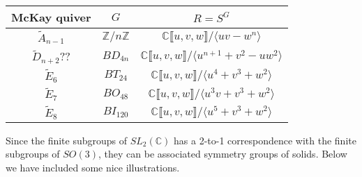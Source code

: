 \documentclass[11pt, a4paper, english]{article}
\theoremstyle{definition}
\newcommand{\C}{\mathbb{C}}
\begin{document}
\begin{center}
{\renewcommand{\arraystretch}{1.6}
\begin{tabular}{|c|c|c|}
\hline
McKay quiver & $G$ & $R = S^G$\\
\hline\hline
$\tilde{A}_{n-1}$ & $\mathbb{Z}/n\mathbb{Z}$ &
$\C \llbracket u, v, w \rrbracket/\langle uv - w^n \rangle$
\\
\hline
$\tilde{D}_{n+2}$?? & $BD_{4n}$ &
$\C \llbracket u, v, w \rrbracket/\langle u^{n+1} + v^2 - uw^2\rangle$
\\
\hline
$\tilde{E}_6$ & $BT_{24}$ &
$\C \llbracket u, v, w \rrbracket/\langle u^4 + v^3 + w^2 \rangle$
\\
\hline
$\tilde{E}_7$ & $BO_{48}$ &
$\C \llbracket u, v, w \rrbracket/\langle u^3v + v^3 + w^2 \rangle$
\\
\hline
$\tilde{E}_8$ & $BI_{120}$ &
$\C \llbracket u, v, w \rrbracket/\langle u^5 + v^3 + w^2 \rangle$
\\
\hline
\end{tabular}
}
\end{center}

Since the finite subgroups of $SL_2(\C)$ has a 2-to-1 correspondence with the finite subgroups of $SO(3)$, they can be associated symmetry groups of solids. Below we have included some nice illustrations.

\end{document}
